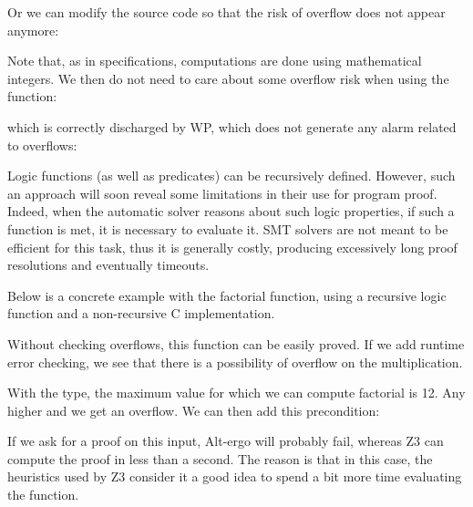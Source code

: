 

Or we can modify the source code so that the risk of overflow does not
appear anymore:




Note that, as in specifications, computations are done using mathematical
integers. We then do not need to care about some overflow risk when using
the  function:




which is correctly discharged by WP, which does not generate any alarm
related to overflows:






Logic functions (as well as predicates) can be recursively defined.
However, such an approach will soon reveal some limitations in their use for
program proof. Indeed, when the automatic solver reasons about such logic
properties, if such a function is met, it is necessary to evaluate it.
SMT solvers are not meant to be efficient for this task, thus it is generally
costly, producing excessively long proof resolutions and eventually timeouts.

Below is a concrete example with the factorial function, using a
recursive logic function and a non-recursive C implementation.






Without checking overflows, this function can be easily proved. If
we add runtime error checking, we see that there is a possibility of
overflow on the multiplication.



With the  type, the maximum value for which we can compute
factorial is 12. Any higher and we get an overflow. We can then add this
precondition:






If we ask for a proof on this input, Alt-ergo will probably fail,
whereas Z3 can compute the proof in less than a second. The reason is
that in this case, the heuristics used by Z3 consider it
a good idea to spend a bit more time evaluating the
function.




